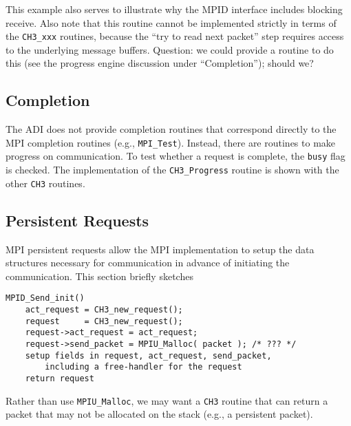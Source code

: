 \documentclass{article}
\def\mpids#1#2{\code{#2}\index{#1!#2}}
\def\code{\begingroup\makeustext\eatcode}
\def\eatcode#1{\texttt{#1}\endgroup}
\begin{document}
This example also serves to illustrate why the MPID interface includes
blocking receive.  Also note that this routine cannot be implemented strictly
in terms of the \code{CH3_xxx} routines, because the ``try to read next
packet'' step requires access to the underlying message buffers.  
Question: we could provide a routine to do this (see the progress engine
discussion under ``Completion''); should we?

\subsection{Completion}
The ADI does not provide completion routines that correspond directly
to the MPI completion routines (e.g., \code{MPI_Test}).  Instead,
there are routines to make progress on communication.  To test whether
a request is complete, the \mpids{MPID_Request}{busy} flag is checked.
The implementation of the \code{CH3_Progress} routine is shown with the other
\code{CH3} routines.



\subsection{Persistent Requests}
MPI persistent requests allow the MPI implementation to setup the data
structures necessary for communication in advance of initiating the
communication.  This section briefly sketches 

\begin{verbatim}
MPID_Send_init()
    act_request = CH3_new_request();
    request     = CH3_new_request();
    request->act_request = act_request;
    request->send_packet = MPIU_Malloc( packet ); /* ??? */
    setup fields in request, act_request, send_packet, 
        including a free-handler for the request
    return request   
\end{verbatim}
Rather than use \code{MPIU_Malloc}, we may want a \code{CH3} routine that can
return a packet that may not be allocated on the stack (e.g., a persistent
packet).  
\end{document}
